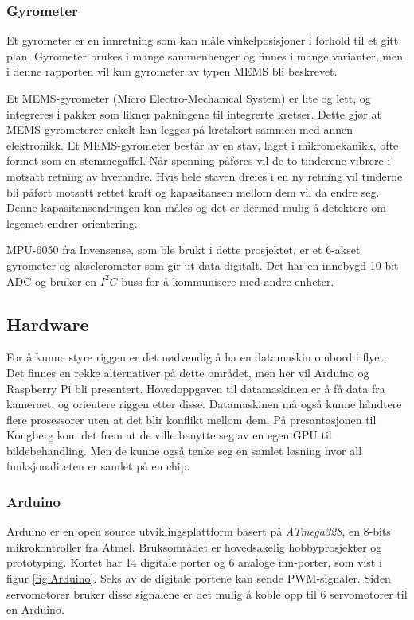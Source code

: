 \subsubsection{Gyrometer}

Et gyrometer er en innretning som kan måle vinkelposisjoner i forhold til et gitt plan. Gyrometer brukes i mange sammenhenger og finnes i mange varianter, men i denne rapporten vil kun gyrometer av typen MEMS bli beskrevet. 

Et MEMS-gyrometer (Micro Electro-Mechanical System) er lite og lett, og integreres i pakker som likner pakningene til integrerte kretser. Dette gjør at MEMS-gyrometerer enkelt kan legges på kretskort sammen med annen elektronikk. Et MEMS-gyrometer består av en stav, laget i mikromekanikk, ofte formet som en stemmegaffel. Når spenning påføres vil de to tinderene vibrere i motsatt retning av hverandre. Hvis hele staven dreies i en ny retning vil tinderne bli påført motsatt rettet kraft og kapasitansen mellom dem vil da endre seg. Denne kapasitansendringen kan måles og det er dermed mulig å detektere om legemet endrer orientering.\cite{MEMS}

MPU-6050 fra Invensense, som ble brukt i dette prosjektet, er et 6-akset gyrometer og akselerometer som gir ut data digitalt. Det har en innebygd 10-bit ADC og bruker en $I^{2}C$-buss for å kommunisere med andre enheter.\cite{InSens}

\subsection{Hardware}
For å kunne styre riggen er det nødvendig å ha en datamaskin ombord i flyet. Det finnes en rekke alternativer på dette området, men her vil Arduino og Raspberry Pi bli presentert. Hovedoppgaven til datamaskinen er å få data fra kameraet, og orientere riggen etter disse. Datamaskinen må også kunne håndtere flere prosessorer uten at det blir konflikt mellom dem. På presantasjonen til Kongberg kom det frem at de ville benytte seg av en egen GPU til bildebehandling. Men de kunne også tenke seg en samlet løsning hvor all funksjonaliteten er samlet på en chip.

\subsubsection{Arduino}
Arduino er en open source utviklingsplattform basert på \textit{ATmega328}, en 8-bits mikrokontroller fra Atmel. Bruksområdet er hovedsakelig hobbyprosjekter og prototyping. Kortet har 14 digitale porter og 6 analoge inn-porter, som vist i figur \ref{fig:Arduino}. Seks av de digitale portene kan sende PWM-signaler. Siden servomotorer bruker disse signalene er det mulig å koble opp til 6 servomotorer til en Arduino. 


